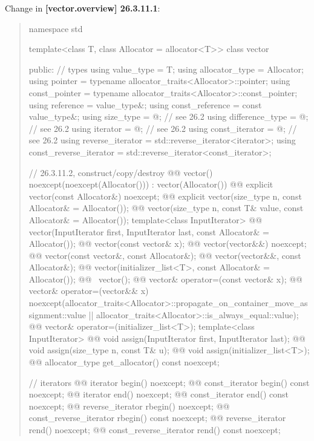 \documentclass{wg21}
\begin{document}
Change in \textbf{[vector.overview] 26.3.11.1}:
\begin{quote}
\begin{codeblock}
namespace std {
  template<class T, class Allocator = allocator<T>>
  class vector {
  public:
    // types
    using value_type             = T;
    using allocator_type         = Allocator;
    using pointer                = typename allocator_traits<Allocator>::pointer;
    using const_pointer          = typename allocator_traits<Allocator>::const_pointer;
    using reference              = value_type&;
    using const_reference        = const value_type&;
    using size_type              = @\impdef@; // see 26.2
    using difference_type        = @\impdef@; // see 26.2
    using iterator               = @\impdef@; // see 26.2
    using const_iterator         = @\impdef@; // see 26.2
    using reverse_iterator       = std::reverse_iterator<iterator>;
    using const_reverse_iterator = std::reverse_iterator<const_iterator>;

    // 26.3.11.2, construct/copy/destroy
    @@ vector() noexcept(noexcept(Allocator())) : vector(Allocator()) { }
    @@ explicit vector(const Allocator&) noexcept;
    @@ explicit vector(size_type n, const Allocator& = Allocator());
    @@ vector(size_type n, const T& value, const Allocator& = Allocator());
    template<class InputIterator>
      @@ vector(InputIterator first, InputIterator last, const Allocator& = Allocator());
    @@ vector(const vector& x);
    @@ vector(vector&&) noexcept;
    @@ vector(const vector&, const Allocator&);
    @@ vector(vector&&, const Allocator&);
    @@ vector(initializer_list<T>, const Allocator& = Allocator());
    @@ ~vector();
    @@ vector& operator=(const vector& x);
    @@ vector& operator=(vector&& x)
      noexcept(allocator_traits<Allocator>::propagate_on_container_move_assignment::value ||
               allocator_traits<Allocator>::is_always_equal::value);
    @@ vector& operator=(initializer_list<T>);
    template<class InputIterator>
      @@ void assign(InputIterator first, InputIterator last);
    @@ void assign(size_type n, const T& u);
    @@ void assign(initializer_list<T>);
    @@ allocator_type get_allocator() const noexcept;

    // iterators
    @@ iterator               begin() noexcept;
    @@ const_iterator         begin() const noexcept;
    @@ iterator               end() noexcept;
    @@ const_iterator         end() const noexcept;
    @@ reverse_iterator       rbegin() noexcept;
    @@ const_reverse_iterator rbegin() const noexcept;
    @@ reverse_iterator       rend() noexcept;
    @@ const_reverse_iterator rend() const noexcept;

}}
\end{codeblock}
\end{quote}
\end{document}
